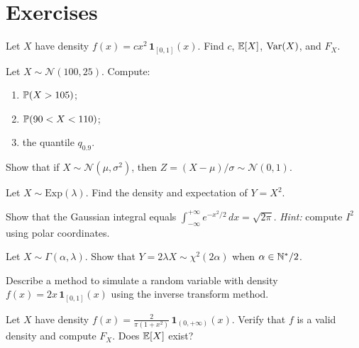 \section{Exercises}

\begin{exercise}
Let $X$ have density $f(x) = cx^2\,\mathbf{1}_{[0,1]}(x)$. Find $c$, $\mathbb{E}[X]$,
$\mathrm{Var}(X)$, and $F_X$.
\end{exercise}

\begin{exercise}
Let $X \sim \mathcal{N}(100, 25)$. Compute:
\begin{enumerate}[label=(\alph*)]
    \item $\mathbb{P}(X > 105)$;
    \item $\mathbb{P}(90 < X < 110)$;
    \item the quantile $q_{0.9}$.
\end{enumerate}
\end{exercise}

\begin{exercise}
Show that if $X \sim \mathcal{N}(\mu, \sigma^2)$, then $Z = (X - \mu)/\sigma
\sim \mathcal{N}(0,1)$.
\end{exercise}

\begin{exercise}
Let $X \sim \mathrm{Exp}(\lambda)$. Find the density and expectation of $Y = X^2$.
\end{exercise}

\begin{exercise}
Show that the Gaussian integral equals
$\int_{-\infty}^{+\infty} e^{-x^2/2}\,dx = \sqrt{2\pi}$.
\textit{Hint:} compute $I^2$ using polar coordinates.
\end{exercise}

\begin{exercise}
Let $X \sim \Gamma(\alpha, \lambda)$. Show that $Y = 2\lambda X \sim \chi^2(2\alpha)$
when $\alpha \in \mathbb{N}^*/2$.
\end{exercise}

\begin{exercise}[Simulation]
Describe a method to simulate a random variable with density
$f(x) = 2x\,\mathbf{1}_{[0,1]}(x)$ using the inverse transform method.
\end{exercise}

\begin{exercise}
Let $X$ have density $f(x) = \frac{2}{\pi(1+x^2)}\,\mathbf{1}_{(0,+\infty)}(x)$.
Verify that $f$ is a valid density and compute $F_X$. Does $\mathbb{E}[X]$ exist?
\end{exercise}

